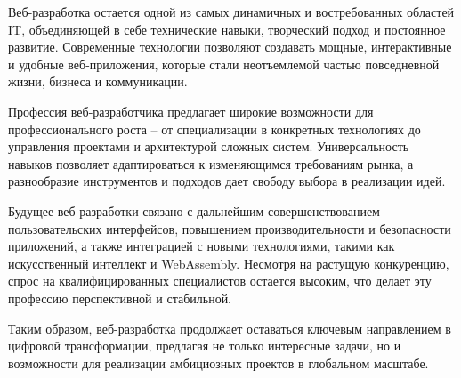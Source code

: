 \documentclass[referat]{SCWorks}
\begin{document}
\conclusion

Веб-разработка остается одной из самых динамичных и востребованных областей IT, объединяющей в себе технические навыки, творческий подход и постоянное развитие. Современные технологии позволяют создавать мощные, интерактивные и удобные веб-приложения, которые стали неотъемлемой частью повседневной жизни, бизнеса и коммуникации.

Профессия веб-разработчика предлагает широкие возможности для профессионального роста -- от специализации в конкретных технологиях до управления проектами и архитектурой сложных систем. Универсальность навыков позволяет адаптироваться к изменяющимся требованиям рынка, а разнообразие инструментов и подходов дает свободу выбора в реализации идей.

Будущее веб-разработки связано с дальнейшим совершенствованием пользовательских интерфейсов, повышением производительности и безопасности приложений, а также интеграцией с новыми технологиями, такими как искусственный интеллект и WebAssembly. Несмотря на растущую конкуренцию, спрос на квалифицированных специалистов остается высоким, что делает эту профессию перспективной и стабильной.

Таким образом, веб-разработка продолжает оставаться ключевым направлением в цифровой трансформации, предлагая не только интересные задачи, но и возможности для реализации амбициозных проектов в глобальном масштабе.\cite{web_dev_2024}
\end{document}
